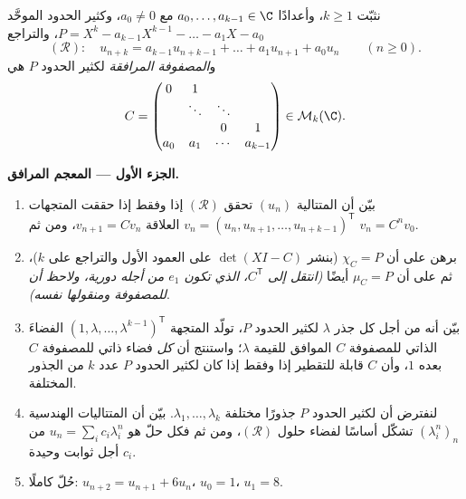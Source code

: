 \begin{problem}
\label{pb:b2:reduction:1}
نثبّت $k \geq 1$، وأعدادًا $a_0, \dots, a_{k-1} \in \C$ مع $a_0
\neq 0$، وكثير الحدود الموحَّد $P = X^k - a_{k-1}X^{k-1} - \dots -
a_1 X - a_0$، والتراجع
\[
(\mathcal R)\colon\quad u_{n+k} = a_{k-1}u_{n+k-1} + \dots +
a_1 u_{n+1} + a_0 u_n \qquad (n \geq 0).
\]
و\emph{المصفوفة المرافقة} لكثير الحدود $P$ هي
\[
C =
\begin{pmatrix}
0 & 1 & & \\
 & \ddots & \ddots & \\
 & & 0 & 1\\
a_0 & a_1 & \cdots & a_{k-1}
\end{pmatrix}
\in \mathcal{M}_k(\C).
\]

\medskip
\noindent\textbf{الجزء الأول --- المعجم المرافق.}
\begin{enumerate}
  \item بيّن أن المتتالية $(u_n)$ تحقق $(\mathcal R)$ إذا
        وفقط إذا حققت المتجهات $v_n = (u_n, u_{n+1}, \dots,
        u_{n+k-1})^{\mathsf T}$ العلاقة $v_{n+1} = Cv_n$، ومن ثم
        $v_n = C^n v_0$.
  \item برهن على أن $\chi_C = P$ (بنشر $\det(XI - C)$ على
        العمود الأول والتراجع على $k$)، ثم على أن $\mu_C = P$
        أيضًا \emph{(انتقل إلى $C^{\mathsf T}$، الذي تكون $e_1$
        من أجله دورية، ولاحظ أن للمصفوفة ومنقولها  نفسه)}.
  \item بيّن أنه من أجل كل جذر $\lambda$ لكثير الحدود $P$، تولّد المتجهة
        $(1, \lambda, \dots, \lambda^{k-1})^{\mathsf T}$ الفضاءَ
        الذاتي للمصفوفة $C$ الموافق للقيمة $\lambda$؛ واستنتج أن
        \emph{كل} فضاء ذاتي للمصفوفة $C$ بعده $1$، وأن
        $C$ قابلة للتقطير إذا وفقط إذا كان لكثير الحدود $P$ عدد $k$
        من الجذور المختلفة.
  \item لنفترض أن لكثير الحدود $P$ جذورًا مختلفة $\lambda_1, \dots,
        \lambda_k$. بيّن أن المتتاليات الهندسية
        $(\lambda_i^n)_n$ تشكّل أساسًا لفضاء حلول
        $(\mathcal R)$، ومن ثم فكل حلّ هو $u_n = \sum_i
        c_i\lambda_i^n$ من أجل ثوابت وحيدة $c_i$.
  \item حُلّ كاملًا: $u_{n+2} = u_{n+1} + 6u_n$، $u_0 = 1$،
        $u_1 = 8$.
\end{enumerate}


\end{problem}
